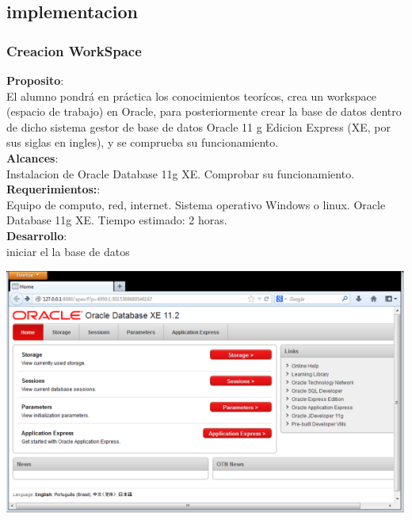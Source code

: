 \documentclass[12pt,letterpaper]{article}
\begin{document}
\subsection{implementacion}
\subsubsection{ Creacion WorkSpace}

\textbf{Proposito}:\\
El alumno pondrá en práctica los conocimientos teorícos, crea un workspace (espacio
de trabajo) en Oracle, para posteriormente crear la base de datos dentro de dicho
sistema gestor de base de datos Oracle 11 g Edicion Express (XE, por sus siglas en
ingles), y se comprueba su funcionamiento.\\
\textbf{Alcances}:\\
Instalacion de Oracle Database 11g XE.
Comprobar su funcionamiento.\\
\textbf{Requerimientos:}:\\
Equipo de computo, red, internet.
Sistema operativo Windows o linux.
Oracle Database 11g XE.
Tiempo estimado: 2 horas.\\
\textbf{Desarrollo}:\\
iniciar el la base de datos
\begin{center}
\includegraphics[width=15cm]{./IMG/img6}
\end{center}
\end{document}
